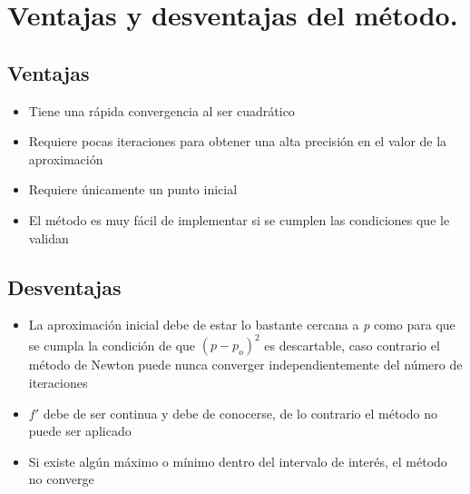 \section{Ventajas y desventajas del método.}

\subsection{Ventajas}

\begin{itemize}
    \item Tiene una rápida convergencia al ser cuadrático
    \item Requiere pocas iteraciones para obtener una alta precisión en el valor de la aproximación
    \item Requiere únicamente un punto inicial
    \item El método es muy fácil de implementar si se cumplen las condiciones que le validan
\end{itemize}

\subsection{Desventajas}

\begin{itemize}
    \item La aproximación inicial debe de estar lo bastante cercana a \textit{p} como para que se cumpla la  condición de que $( p - p_o )^2$ es descartable, caso contrario el método de Newton puede nunca converger independientemente del número de iteraciones \cite{Burden_English}
    \item $f'$ debe de ser continua y debe de conocerse, de lo contrario el método no puede ser aplicado
    \item Si existe algún máximo o mínimo dentro del intervalo de interés, el método no converge
\end{itemize}